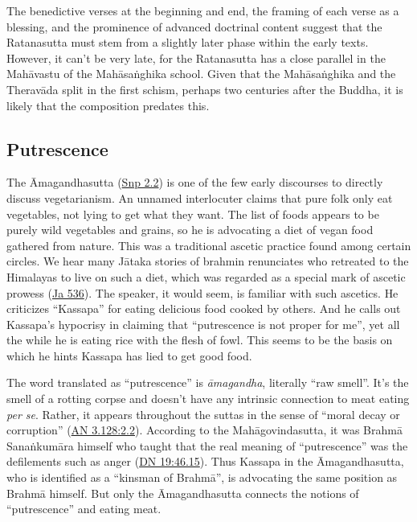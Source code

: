 \documentclass[12pt,openany]{book}%
\begin{document}
The benedictive verses at the beginning and end, the framing of each verse as a blessing, and the prominence of advanced doctrinal content suggest that the Ratanasutta must stem from a slightly later phase within the early texts. However, it can’t be very late, for the Ratanasutta has a close parallel in the \textsanskrit{Mahāvastu} of the \textsanskrit{Mahāsaṅghika} school. Given that the \textsanskrit{Mahāsaṅghika} and the \textsanskrit{Theravāda} split in the first schism, perhaps two centuries after the Buddha, it is likely that the composition predates this.

\subsection*{Putrescence}

The Āmagandhasutta (\href{https://suttacentral.net/snp2.2/en/sujato}{Snp 2.2}) is one of the few early discourses to directly discuss vegetarianism. An unnamed interlocuter claims that pure folk only eat vegetables, not lying to get what they want. The list of foods appears to be purely wild vegetables and grains, so he is advocating a diet of vegan food gathered from nature. This was a traditional ascetic practice found among certain circles. We hear many \textsanskrit{Jātaka} stories of brahmin renunciates who retreated to the Himalayas to live on such a diet, which was regarded as a special mark of ascetic prowess (\href{https://suttacentral.net/ja536}{Ja 536}). The speaker, it would seem, is familiar with such ascetics. He criticizes “Kassapa” for eating delicious food cooked by others. And he calls out Kassapa’s hypocrisy in claiming that “putrescence is not proper for me”, yet all the while he is eating rice with the flesh of fowl. This seems to be the basis on which he hints Kassapa has lied to get good food.

The word translated as “putrescence” is \textit{\textsanskrit{āmagandha}}, literally “raw smell”. It’s the smell of a rotting corpse and doesn’t have any intrinsic connection to meat eating \emph{per se}. Rather, it appears throughout the suttas in the sense of “moral decay or corruption” (\href{https://suttacentral.net/an3.128/en/sujato\#2.2}{AN 3.128:2.2}). According to the \textsanskrit{Mahāgovindasutta}, it was \textsanskrit{Brahmā} \textsanskrit{Sanaṅkumāra} himself who taught that the real meaning of “putrescence” was the defilements such as anger (\href{https://suttacentral.net/dn19/en/sujato\#46.15}{DN 19:46.15}). Thus Kassapa in the Āmagandhasutta, who is identified as a “kinsman of \textsanskrit{Brahmā}”, is advocating the same position as \textsanskrit{Brahmā} himself. But only the Āmagandhasutta connects the notions of “putrescence” and eating meat.
\end{document}
